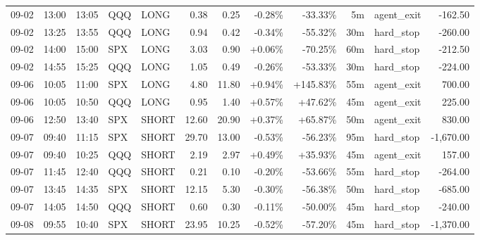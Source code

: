 \documentclass[11pt,a4paper,twoside]{article}
\begin{document}
\begin{center}
\begin{longtable}{>{\color{txtmain}}l l l l l r r r r r >{\color{txtmain}}l r}
09-02 & 13:00 & 13:05 & QQQ & LONG & 0.38 & 0.25 & \textcolor{lossred}{-0.28\%} & \textcolor{lossred}{-33.33\%} & 5m & agent\_exit & \textcolor{lossred}{-162.50} \\
09-02 & 13:25 & 13:55 & QQQ & LONG & 0.94 & 0.42 & \textcolor{lossred}{-0.34\%} & \textcolor{lossred}{-55.32\%} & 30m & hard\_stop & \textcolor{lossred}{-260.00} \\
09-02 & 14:00 & 15:00 & SPX & LONG & 3.03 & 0.90 & \textcolor{wingreen}{+0.06\%} & \textcolor{lossred}{-70.25\%} & 60m & hard\_stop & \textcolor{lossred}{-212.50} \\
09-02 & 14:55 & 15:25 & QQQ & LONG & 1.05 & 0.49 & \textcolor{lossred}{-0.26\%} & \textcolor{lossred}{-53.33\%} & 30m & hard\_stop & \textcolor{lossred}{-224.00} \\
09-06 & 10:05 & 11:00 & SPX & LONG & 4.80 & 11.80 & \textcolor{wingreen}{+0.94\%} & \textcolor{wingreen}{+145.83\%} & 55m & agent\_exit & \textcolor{wingreen}{700.00} \\
09-06 & 10:05 & 10:50 & QQQ & LONG & 0.95 & 1.40 & \textcolor{wingreen}{+0.57\%} & \textcolor{wingreen}{+47.62\%} & 45m & agent\_exit & \textcolor{wingreen}{225.00} \\
09-06 & 12:50 & 13:40 & SPX & SHORT & 12.60 & 20.90 & \textcolor{wingreen}{+0.37\%} & \textcolor{wingreen}{+65.87\%} & 50m & agent\_exit & \textcolor{wingreen}{830.00} \\
09-07 & 09:40 & 11:15 & SPX & SHORT & 29.70 & 13.00 & \textcolor{lossred}{-0.53\%} & \textcolor{lossred}{-56.23\%} & 95m & hard\_stop & \textcolor{lossred}{-1,670.00} \\
09-07 & 09:40 & 10:25 & QQQ & SHORT & 2.19 & 2.97 & \textcolor{wingreen}{+0.49\%} & \textcolor{wingreen}{+35.93\%} & 45m & agent\_exit & \textcolor{wingreen}{157.00} \\
09-07 & 11:45 & 12:40 & QQQ & SHORT & 0.21 & 0.10 & \textcolor{lossred}{-0.20\%} & \textcolor{lossred}{-53.66\%} & 55m & hard\_stop & \textcolor{lossred}{-264.00} \\
09-07 & 13:45 & 14:35 & SPX & SHORT & 12.15 & 5.30 & \textcolor{lossred}{-0.30\%} & \textcolor{lossred}{-56.38\%} & 50m & hard\_stop & \textcolor{lossred}{-685.00} \\
09-07 & 14:05 & 14:50 & QQQ & SHORT & 0.60 & 0.30 & \textcolor{lossred}{-0.11\%} & \textcolor{lossred}{-50.00\%} & 45m & hard\_stop & \textcolor{lossred}{-240.00} \\
09-08 & 09:55 & 10:40 & SPX & SHORT & 23.95 & 10.25 & \textcolor{lossred}{-0.52\%} & \textcolor{lossred}{-57.20\%} & 45m & hard\_stop & \textcolor{lossred}{-1,370.00} \\

\end{longtable}
\end{center}
\end{document}
